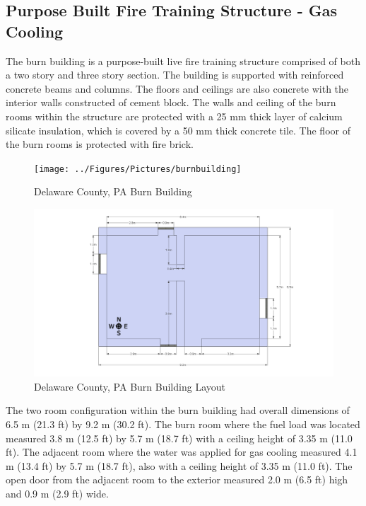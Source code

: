 \documentclass[12pt,oneside]{book}
\begin{document}
\subsection{Purpose Built Fire Training Structure - Gas Cooling}
\label{sec:Burn_Building}

The burn building is a purpose-built live fire training structure comprised of both a two story and three story section. The building is supported with reinforced concrete beams and columns.  The floors and ceilings are also concrete with the interior walls constructed of cement block. The walls and ceiling of the burn rooms within the structure are protected with a 25 mm thick layer of calcium silicate insulation, which is covered by a 50 mm thick concrete tile. The floor of the burn rooms is protected with fire brick.

\begin{figure}[!ht]
	\texttt{[image: ../Figures/Pictures/burnbuilding]}
	\caption{Delaware County, PA Burn Building}
	\label{fig:Delaware_County,_PA_Burn_Building}
\end{figure}

\begin{figure}[!ht]
	\includegraphics[width=6in]{../Figures/Pictures/DelCoBurnBuildingDimensions}
	\caption{Delaware County, PA Burn Building Layout}
	\label{fig:Delaware_County,_PA_Burn_Building_Layout}
\end{figure}

The two room configuration within the burn building had overall dimensions of 6.5 m (21.3 ft) by 9.2 m (30.2 ft). The burn room where the fuel load was located measured 3.8 m (12.5 ft) by 5.7 m (18.7 ft) with a ceiling height of 3.35 m (11.0 ft). The adjacent room where the water was applied for gas cooling measured 4.1 m (13.4 ft) by 5.7 m (18.7 ft), also with a ceiling height of 3.35 m (11.0 ft). The open door from the adjacent room to the exterior measured 2.0 m (6.5 ft) high and 0.9 m (2.9 ft) wide. 
\end{document}
